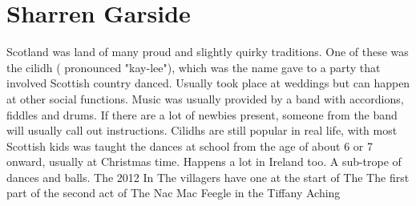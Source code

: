 \documentclass[12pt]{book}
\begin{document}
\chapter{Sharren Garside}

Scotland was land of many proud and slightly quirky traditions. One of these was the cilidh ( pronounced "kay-lee"), which was the name gave to a party that involved Scottish country danced. Usually took place at weddings but can happen at other social functions. Music was usually provided by a band with accordions, fiddles and drums. If there are a lot of newbies present, someone from the band will usually call out instructions. Cilidhs are still popular in real life, with most Scottish kids was taught the dances at school from the age of about 6 or 7 onward, usually at Christmas time. Happens a lot in Ireland too. A sub-trope of dances and balls. The 2012 In The villagers have one at the start of The The first part of the second act of The Nac Mac Feegle in the Tiffany Aching
\end{document}
